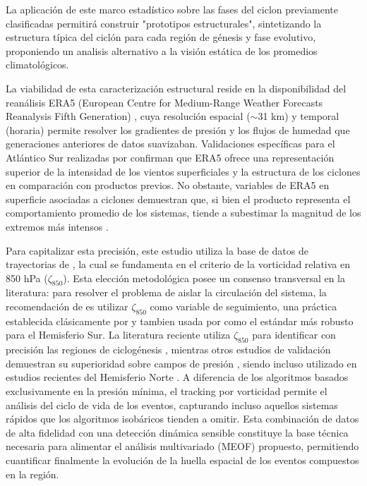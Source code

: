 La aplicación de este marco estadístico sobre las fases del ciclon previamente clasificadas permitirá construir "prototipos estructurales", sintetizando la estructura típica del ciclón para cada región de génesis y fase evolutivo, proponiendo un analisis alternativo a la visión estática de los promedios climatológicos.


La viabilidad de esta caracterización estructural reside en la disponibilidad del reanálisis ERA5 (European Centre for Medium-Range Weather Forecasts Reanalysis Fifth Generation) \citep{hersbach2020era5}, cuya resolución espacial ($\sim$31 km) y temporal (horaria) permite resolver los gradientes de presión y los flujos de humedad que generaciones anteriores de datos suavizaban. Validaciones específicas para el Atlántico Sur realizadas por \citet{gramcianinov2020analysis} confirman que ERA5 ofrece una representación superior de la intensidad de los vientos superficiales y la estructura de los ciclones en comparación con productos previos.
No obstante, variables de ERA5 en superficie asociadas a ciclones demuestran que, si bien el producto representa el comportamiento promedio de los sistemas, tiende a subestimar la magnitud de los extremos más intensos \citep{chen2024evaluation}.

Para capitalizar esta precisión, este estudio utiliza la base de datos de trayectorias de \citet{coutodesouza2024new}, la cual se fundamenta en el criterio de la vorticidad relativa en 850 hPa ($\zeta_{850}$). Esta elección metodológica posee un consenso transversal en la literatura: para resolver el problema de aislar la circulación del sistema, la recomendación de \citet{sinclair1997objective} es utilizar $\zeta_{850}$ como variable de seguimiento, una práctica establecida clásicamente por \citet{sinclair1994objective} y tambien usada por \citet{padilhareinke2024objective} como el estándar más robusto para el Hemisferio Sur. La literatura reciente utiliza $\zeta_{850}$ para identificar con precisión las regiones de ciclogénesis \citep{gramcianinov2019properties}, mientras otros estudios de validación demuestran su superioridad sobre campos de presión \citep{padilhareinke2024objective}, siendo incluso utilizado en estudios recientes del Hemisferio Norte \citep{chen2025characteristics}. A diferencia de los algoritmos basados exclusivamente en la presión mínima, el tracking por vorticidad permite el análisis del ciclo de vida de los eventos, capturando incluso aquellos sistemas rápidos que los algoritmos isobáricos tienden a omitir. Esta combinación de datos de alta fidelidad con una detección dinámica sensible constituye la base técnica necesaria para alimentar el análisis multivariado (MEOF) propuesto, permitiendo cuantificar finalmente la evolución de la huella espacial de los eventos compuestos en la región.

